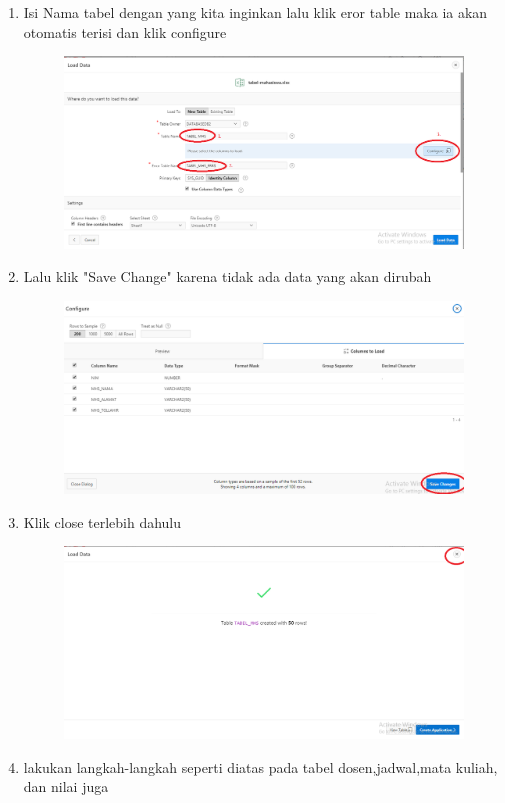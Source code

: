 \begin{enumerate}
	\item Isi Nama tabel dengan yang kita inginkan lalu klik eror table maka ia akan otomatis terisi dan klik configure 
	\begin{figure} [!htbp]
	\includegraphics[scale=0.2]{Apex/15.png}
	\centering
	\end{figure}
	
	\item Lalu klik "Save Change" karena tidak ada data yang akan dirubah 
	\begin{figure} [!htbp]
	\includegraphics[scale=0.2]{Apex/17a.png}
	\centering
	\end{figure}
	
	\item Klik close terlebih dahulu 
	\begin{figure} [!htbp]
	\includegraphics[scale=0.2]{Apex/17.png}
	\centering
	\end{figure}
	
	\item lakukan langkah-langkah seperti diatas pada tabel dosen,jadwal,mata kuliah, dan nilai juga
	
	
\end{enumerate}
